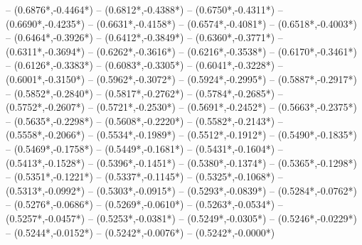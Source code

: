 {	-- ({0.6876*\dx},{-0.4464*\dy})
	-- ({0.6812*\dx},{-0.4388*\dy})
	-- ({0.6750*\dx},{-0.4311*\dy})
	-- ({0.6690*\dx},{-0.4235*\dy})
	-- ({0.6631*\dx},{-0.4158*\dy})
	-- ({0.6574*\dx},{-0.4081*\dy})
	-- ({0.6518*\dx},{-0.4003*\dy})
	-- ({0.6464*\dx},{-0.3926*\dy})
	-- ({0.6412*\dx},{-0.3849*\dy})
	-- ({0.6360*\dx},{-0.3771*\dy})
	-- ({0.6311*\dx},{-0.3694*\dy})
	-- ({0.6262*\dx},{-0.3616*\dy})
	-- ({0.6216*\dx},{-0.3538*\dy})
	-- ({0.6170*\dx},{-0.3461*\dy})
	-- ({0.6126*\dx},{-0.3383*\dy})
	-- ({0.6083*\dx},{-0.3305*\dy})
	-- ({0.6041*\dx},{-0.3228*\dy})
	-- ({0.6001*\dx},{-0.3150*\dy})
	-- ({0.5962*\dx},{-0.3072*\dy})
	-- ({0.5924*\dx},{-0.2995*\dy})
	-- ({0.5887*\dx},{-0.2917*\dy})
	-- ({0.5852*\dx},{-0.2840*\dy})
	-- ({0.5817*\dx},{-0.2762*\dy})
	-- ({0.5784*\dx},{-0.2685*\dy})
	-- ({0.5752*\dx},{-0.2607*\dy})
	-- ({0.5721*\dx},{-0.2530*\dy})
	-- ({0.5691*\dx},{-0.2452*\dy})
	-- ({0.5663*\dx},{-0.2375*\dy})
	-- ({0.5635*\dx},{-0.2298*\dy})
	-- ({0.5608*\dx},{-0.2220*\dy})
	-- ({0.5582*\dx},{-0.2143*\dy})
	-- ({0.5558*\dx},{-0.2066*\dy})
	-- ({0.5534*\dx},{-0.1989*\dy})
	-- ({0.5512*\dx},{-0.1912*\dy})
	-- ({0.5490*\dx},{-0.1835*\dy})
	-- ({0.5469*\dx},{-0.1758*\dy})
	-- ({0.5449*\dx},{-0.1681*\dy})
	-- ({0.5431*\dx},{-0.1604*\dy})
	-- ({0.5413*\dx},{-0.1528*\dy})
	-- ({0.5396*\dx},{-0.1451*\dy})
	-- ({0.5380*\dx},{-0.1374*\dy})
	-- ({0.5365*\dx},{-0.1298*\dy})
	-- ({0.5351*\dx},{-0.1221*\dy})
	-- ({0.5337*\dx},{-0.1145*\dy})
	-- ({0.5325*\dx},{-0.1068*\dy})
	-- ({0.5313*\dx},{-0.0992*\dy})
	-- ({0.5303*\dx},{-0.0915*\dy})
	-- ({0.5293*\dx},{-0.0839*\dy})
	-- ({0.5284*\dx},{-0.0762*\dy})
	-- ({0.5276*\dx},{-0.0686*\dy})
	-- ({0.5269*\dx},{-0.0610*\dy})
	-- ({0.5263*\dx},{-0.0534*\dy})
	-- ({0.5257*\dx},{-0.0457*\dy})
	-- ({0.5253*\dx},{-0.0381*\dy})
	-- ({0.5249*\dx},{-0.0305*\dy})
	-- ({0.5246*\dx},{-0.0229*\dy})
	-- ({0.5244*\dx},{-0.0152*\dy})
	-- ({0.5242*\dx},{-0.0076*\dy})
	-- ({0.5242*\dx},{-0.0000*\dy})
}
